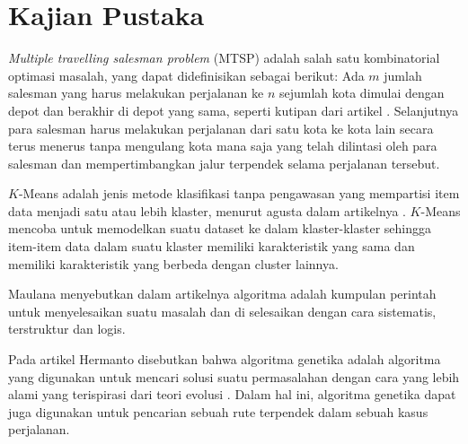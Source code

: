 \section{Kajian Pustaka}

\textit{Multiple travelling salesman problem} (MTSP) adalah salah satu kombinatorial optimasi masalah, yang dapat didefinisikan sebagai berikut: Ada $m$ jumlah salesman yang harus melakukan perjalanan ke $n$ sejumlah kota dimulai dengan depot dan berakhir di depot yang sama, seperti kutipan dari artikel \cite{al2019comparative}. Selanjutnya para salesman harus melakukan perjalanan dari satu kota ke kota lain secara terus menerus tanpa mengulang kota mana saja yang telah dilintasi oleh para salesman dan mempertimbangkan jalur terpendek selama perjalanan tersebut.

$K$-Means adalah jenis metode klasifikasi tanpa pengawasan yang mempartisi item data menjadi satu atau lebih klaster, menurut agusta dalam artikelnya \cite{agusta2007k}. $K$-Means mencoba untuk memodelkan suatu dataset ke dalam klaster-klaster sehingga item-item data dalam suatu klaster memiliki karakteristik yang sama dan memiliki karakteristik yang berbeda dengan cluster lainnya.

Maulana menyebutkan dalam artikelnya algoritma adalah kumpulan perintah untuk menyelesaikan suatu masalah dan di selesaikan dengan cara sistematis, terstruktur dan logis. \cite{maulana2017pembelajaran}

Pada artikel Hermanto disebutkan bahwa algoritma genetika adalah algoritma yang digunakan untuk mencari solusi suatu permasalahan dengan cara yang lebih alami yang terispirasi dari teori evolusi  \cite{hermawanto2003algoritma}. Dalam hal ini, algoritma genetika dapat juga digunakan untuk pencarian sebuah rute terpendek dalam sebuah kasus perjalanan.
